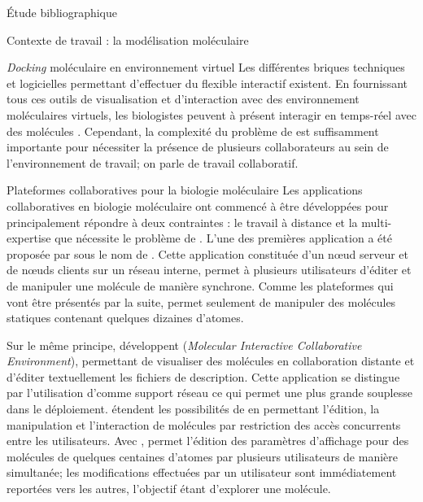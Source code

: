 \documentclass[myfrancais,ngerman,english,french]{mythesis}
\begin{document}
\begin{mychapter}{Étude bibliographique}
\begin{mysection}{Contexte de travail : la modélisation moléculaire}
\begin{mysubsection}{\textit{Docking} moléculaire en environnement virtuel}
				Les différentes briques techniques et logicielles permettant d'effectuer du  flexible interactif existent.
				En fournissant tous ces outils de visualisation et d'interaction avec des environnement moléculaires virtuels, les biologistes peuvent à présent interagir en temps-réel avec des molécules .
				Cependant, la complexité du problème de  est suffisamment importante pour nécessiter la présence de plusieurs collaborateurs au sein de l'environnement de travail; on parle de travail collaboratif.

				\begin{myfigure}
				\end{myfigure}
			\end{mysubsection}
			\begin{mysubsection}{Plateformes collaboratives pour la biologie moléculaire}
				Les applications collaboratives en biologie moléculaire ont commencé à être développées pour principalement répondre à deux contraintes : le travail à distance et la multi-expertise que nécessite le problème de .
				L'une des premières application a été proposée par  sous le nom de \myEyeChem.
				Cette application constituée d'un nœud serveur et de nœuds clients sur un réseau interne, permet à plusieurs utilisateurs d'éditer et de manipuler une molécule de manière synchrone.
				Comme les plateformes qui vont être présentés par la suite, \myEyeChem permet seulement de manipuler des molécules statiques contenant quelques dizaines d'atomes.

				Sur le même principe,  développent \myMICE (\textit{Molecular Interactive Collaborative Environment}), permettant de visualiser des molécules en collaboration distante et d'éditer textuellement les fichiers de description.
				Cette application se distingue par l'utilisation d'\myInternet comme support réseau ce qui permet une plus grande souplesse dans le déploiement.
				 étendent les possibilités de \myMICE en permettant l'édition, la manipulation et l'interaction de molécules par restriction des accès concurrents entre les utilisateurs.
				Avec \myChimera,  permet l'édition des paramètres d'affichage \myThreeD pour des molécules de quelques centaines d'atomes par plusieurs utilisateurs de manière simultanée; les modifications effectuées par un utilisateur sont immédiatement reportées vers les autres, l'objectif étant d'explorer une molécule.


\end{mysubsection}
\end{mysection}
\end{mychapter}
\end{document}
